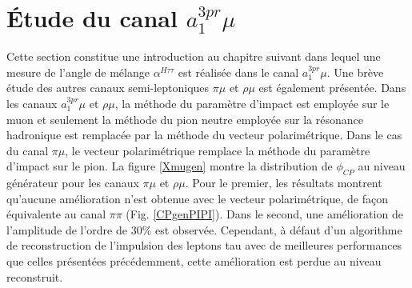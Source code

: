 \section{Étude du canal $a_1^{3pr}\mu$}

Cette section constitue une introduction au chapitre suivant dans lequel une mesure de l'angle de mélange $\alpha^{H\tau\tau}$ est réalisée dans le canal $a_1^{3pr}\mu$. Une brève étude des autres canaux semi-leptoniques $\pi\mu$ et $\rho\mu$ est également présentée. Dans les canaux $a_1^{3pr}\mu$ et $\rho\mu$, la méthode du paramètre d'impact est employée sur le muon et seulement la méthode du pion neutre employée sur la résonance hadronique est remplacée par la méthode du vecteur polarimétrique. Dans le cas du canal $\pi\mu$, le vecteur polarimétrique remplace la méthode du paramètre d'impact sur le pion. La figure \ref{Xmugen} montre la distribution de $\phi_{CP}$ au niveau générateur pour les canaux $\pi\mu$ et $\rho\mu$. Pour le premier, les résultats montrent qu'aucune amélioration n'est obtenue avec le vecteur polarimétrique, de façon équivalente au canal $\pi\pi$ (Fig. \ref{CPgenPIPI}). Dans le second, une amélioration de l'amplitude de l'ordre de $30\%$ est observée. Cependant, à défaut d'un algorithme de reconstruction de l'impulsion des leptons tau avec de meilleures performances que celles présentées précédemment, cette amélioration est perdue au niveau reconstruit.  \\

